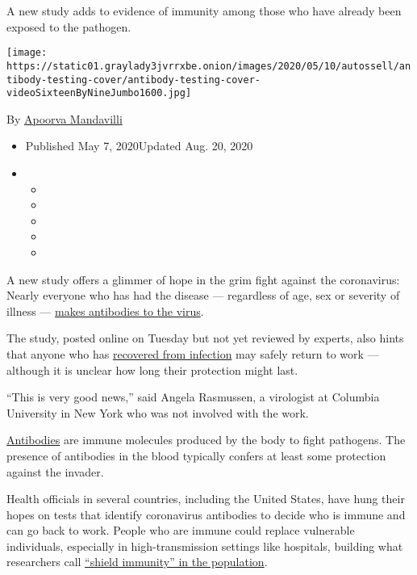 A new study adds to evidence of immunity among those who have already
been exposed to the pathogen.

\texttt{[image: https://static01.graylady3jvrrxbe.onion/images/2020/05/10/autossell/antibody-testing-cover/antibody-testing-cover-videoSixteenByNineJumbo1600.jpg]}

By
\href{https://www.nytimes3xbfgragh.onion/by/apoorva-mandavilli}{Apoorva
Mandavilli}

\begin{itemize}
\item
  Published May 7, 2020Updated Aug. 20, 2020
\item
  \begin{itemize}
  \item
  \item
  \item
  \item
  \item
  \end{itemize}
\end{itemize}

A new study offers a glimmer of hope in the grim fight against the
coronavirus: Nearly everyone who has had the disease --- regardless of
age, sex or severity of illness ---
\href{https://www.medrxiv.org/content/10.1101/2020.04.30.20085613v1}{makes
antibodies to the virus}.

The study, posted online on Tuesday but not yet reviewed by experts,
also hints that anyone who has
\href{https://www.nytimes3xbfgragh.onion/2020/06/17/nyregion/coronavirus-recovery-hospital.html}{recovered
from infection} may safely return to work --- although it is unclear how
long their protection might last.

``This is very good news,'' said Angela Rasmussen, a virologist at
Columbia University in New York who was not involved with the work.

\href{https://www.nytimes3xbfgragh.onion/2020/08/20/nyregion/nyc-coronavirus-antibody-testing.html}{Antibodies}
are immune molecules produced by the body to fight pathogens. The
presence of antibodies in the blood typically confers at least some
protection against the invader.

Health officials in several countries, including the United States, have
hung their hopes on tests that identify coronavirus antibodies to decide
who is immune and can go back to work. People who are immune could
replace vulnerable individuals, especially in high-transmission settings
like hospitals, building what researchers call
\href{https://www.nature.com/articles/s41591-020-0895-3}{``shield
immunity'' in the population}.

